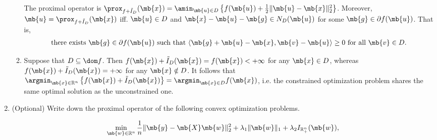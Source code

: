 \begin{exercise}
\begin{enumerate}
\begin{solution}
\begin{enumerate}
                        The proximal operator is $\prox_{f+\tilde{I}_D}(\mb{x}) = \amin_{\mb{u}\in D}\left\{f(\mb{u})+\frac{1}{2}\|\mb{u}-\mb{x}\|_2^2\right\}$. Moreover, $\mb{u} = \prox_{f+\tilde{I}_D}(\mb{x})$ iff. $\mb{u} \in D$ and $\mb{x} - \mb{u} -\mb{g} \in N_D(\mb{u})$ for some $\mb{g} \in \partial f(\mb{u})$. That is,
                        \begin{align*}
                            \text{there exists $\mb{g} \in \partial f(\mb{u})$ such that $\langle\mb{g}+\mb{u}-\mb{x},\mb{v}-\mb{u}\rangle \ge 0$ for all $\mb{v} \in D$.}
                        \end{align*}

                    \item Suppose that $D \subseteq \dom f$. Then $f(\mb{x}) + \tilde{I}_D(\mb{x}) = f(\mb{x}) < +\infty$ for any $\mb{x}\in D$, whereas $f(\mb{x}) + \tilde{I}_D(\mb{x}) = +\infty$ for any $\mb{x}\notin D$. It follows that $\argmin_{\mb{x}\in\mathbb{R}^n} \left\{f(\mb{x})+\tilde{I}_D(\mb{x})\right\} = \argmin_{\mb{x}\in D} f(\mb{x})$, i.e. the constrained optimization problem shares the same optimal solution as the unconstrained one.
                        \qedhere
                \end{enumerate}
            \end{solution}

        \item (Optional) Write down the proximal operator of the following convex optimization problems.

            \begin{align*}
                \min_{\mb{w}\in\mathbb{R}^n} \frac{1}{n}\|\mb{y}-\mb{X}\mb{w}\|_2^2+\lambda_1 \|\mb{w}\|_1+\lambda_2 I_{\mathbb{R}^n_+}(\mb{w}),
            \end{align*}


\end{enumerate}
\end{exercise}
